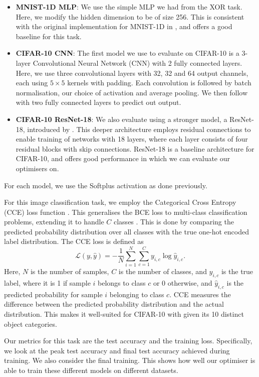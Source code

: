 \begin{itemize}
    \item \textbf{MNIST-1D MLP}: We use the simple MLP we had from the XOR task. Here, we modify the hidden dimension to be of size 256. This is consistent with the original implementation for MNIST-1D in \citep{greydanus_mnist1d}, and offers a good baseline for this task.
    \item \textbf{CIFAR-10 CNN}: The first model we use to evaluate on CIFAR-10 is a 3-layer Convolutional Neural Network (CNN) with 2 fully connected layers. Here, we use three convolutional layers with 32, 32 and 64 output channels, each using $5 \times 5$ kernels with padding. Each convolution is followed by batch normalisation, our choice of activation and average pooling. We then follow with two fully connected layers to predict out output.
    \item \textbf{CIFAR-10 ResNet-18}: We also evaluate using a stronger model, a ResNet-18, introduced by \citep{resnet}. This deeper architecture employs residual connections to enable training of networks with 18 layers, where each layer consists of four residual blocks with skip connections. ResNet-18 is a baseline architecture for CIFAR-10, and offers good performance in which we can evaluate our optimisers on. 
\end{itemize}
For each model, we use the Softplus activation as done previously. 

For this image classification task, we employ the Categorical Cross Entropy (CCE) loss function \citep{mao2023cross}. This generalises the BCE loss to multi-class classification problems, extending it to handle $C$ classes \citep{mao2023cross}. This is done by comparing the predicted probability distribution over all classes with the true one-hot encoded label distribution. The CCE loss is defined as
\begin{equation}
\mathcal{L}(y, \hat{y}) = -\frac{1}{N} \sum_{i=1}^N \sum_{c=1}^C y_{i,c} \log \hat{y}_{i,c}.
\end{equation}
Here, $N$ is the number of samples, $C$ is the number of classes, and $y_{i,c}$ is the true label, where it is 1 if sample $i$ belongs to class $c$ or 0 otherwise, and $\hat{y}_{i,c}$ is the predicted probability for sample $i$ belonging to class $c$. CCE measures the difference between the predicted probability distribution and the actual distribution. This makes it well-suited for CIFAR-10 with given its 10 distinct object categories.

Our metrics for this task are the test accuracy and the training loss. Specifically, we look at the peak test accuracy and final test accuracy achieved during training. We also consider the final training. This shows how well our optimiser is able to train these different models on different datasets.

